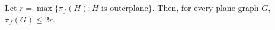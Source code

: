 \documentclass{cccg16}
\begin{document}
\begin{thm}
   Let $r=\max\{\pi_f(H):\text{$H$ is outerplane}\}$.  Then, for every
   plane graph $G$, $\pi_f(G)\le 2r$.
\end{thm}

%
%
%
%
\end{document}
